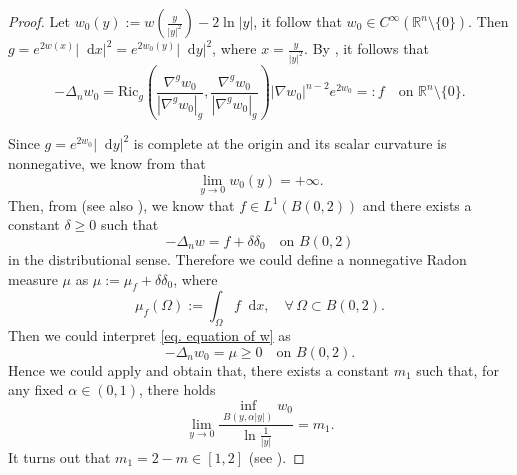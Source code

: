 \documentclass[10pt,a4paper]{amsart}
\numberwithin{equation}{section}
\newcommand{\dx}{\mathop{}\!\mathrm{d}x}
\newcommand{\dy}{\mathop{}\!\mathrm{d}y}
\begin{document}
\begin{proof}
Let $w_0(y):=w(\frac{y}{|y|^2})-2\ln|y|$, it follow that $w_0\in C^{\infty}(\mathbb{R}^n\setminus\{0\})$. Then $g=e^{2w(x)}|\dx|^2=e^{2w_0(y)}|\dy|^2 $, where $x=\frac{y}{|y|^2}$. By \cite[(2.18)]{MQ}, it follows that
    \begin{equation}\label{eq. equation of w}
        -\Delta_n w_0
        =\mathrm{Ric}_g
        \left(\frac{\nabla^g w_0}{|\nabla^g w_0|_g},\frac{\nabla^g w_0}{|\nabla^g w_0|_g}\right)
            |\nabla w_0|^{n-2}e^{2w_0}=:f
            \quad \text{on } \mathbb{R}^n\setminus\{0\}.
    \end{equation}
    
    Since $g=e^{2w_0}|\dy|^2 $ is complete at the origin and its scalar curvature is nonnegative, we know from
    \cite[Proposition 8.1]{CHY04} that
    \[
        \lim_{y\to 0} w_0(y)=+\infty.
    \]
    Then, from \cite[proposition 1.1]{B-V89} (see also \cite[Theorem 2.4]{MQ}), we know that $f\in L^1(B(0,2))$ and there exists a constant $\delta\geq 0$ such that 
    \[
        -\Delta_n w=f+\delta\delta_0 \quad \text{on } B(0,2)
    \]
    in the distributional sense.
    Therefore we could define a nonnegative Radon measure $\mu$ as $\mu:=\mu_f+\delta \delta_0$, where
    \[
        \mu_f(\Omega):=
        \int_{\Omega}f\dx,\quad \forall\, \Omega\subset  B(0,2).
    \]
    Then we could interpret \cref{eq. equation of w} as
    \[
        -\Delta_n w_0=\mu\geq 0 \quad \text{on } B(0,2).
    \]
    Hence we could apply \cite[Lemma 3.7, Theorem 3.1]{MQ} and obtain that, there exists a constant $m_1$ such that, for any fixed $\alpha\in (0,1)$, there holds
    \begin{equation}\label{eq. lemma 3.7 of MQ}
        \lim_{y\to 0}\frac{\inf_{B(y,\alpha|y|)}w_0}{\ln\frac{1}{|y|}}
        =m_1.
    \end{equation}
    It turns out that $m_1=2-m\in [1,2]$ (see \cite[(5.5),(5.6)]{MQ}). 


\end{proof}
\end{document}
